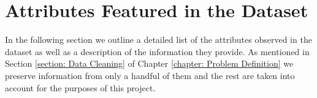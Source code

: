 \section{Attributes Featured in the Dataset}
\label{subsection: Eliminated Attributes}
In the following section we outline a detailed list of the attributes observed in the dataset as well as a description of the information they provide. As mentioned in Section \ref{section: Data Cleaning} of Chapter \ref{chapter: Problem Definition} we preserve information from only a handful of them and the rest are taken into account for the purposes of this project.




